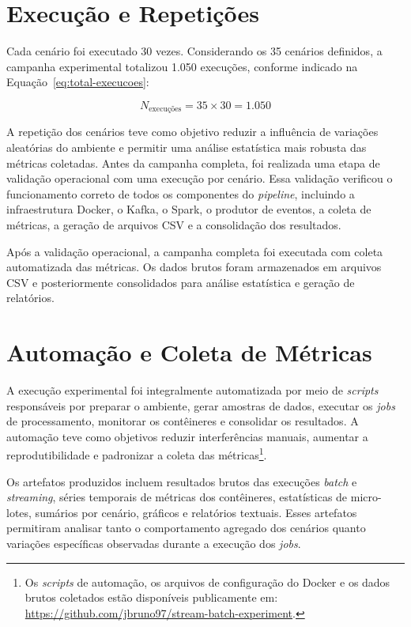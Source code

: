 \section{Execução e Repetições}
\label{sec:execucao-repeticoes}
 
Cada cenário foi executado 30 vezes. Considerando os 35 cenários definidos, a campanha experimental totalizou 1.050 execuções, conforme indicado na Equação~\ref{eq:total-execucoes}:
 
\begin{equation}
N_{\text{execuções}} = 35 \times 30 = 1.050
\label{eq:total-execucoes}
\end{equation}
 
A repetição dos cenários teve como objetivo reduzir a influência de variações aleatórias do ambiente e permitir uma análise estatística mais robusta das métricas coletadas. Antes da campanha completa, foi realizada uma etapa de validação operacional com uma execução por cenário. Essa validação verificou o funcionamento correto de todos os componentes do \textit{pipeline}, incluindo a infraestrutura Docker, o Kafka, o Spark, o produtor de eventos, a coleta de métricas, a geração de arquivos CSV e a consolidação dos resultados.
 
Após a validação operacional, a campanha completa foi executada com coleta automatizada das métricas. Os dados brutos foram armazenados em arquivos CSV e posteriormente consolidados para análise estatística e geração de relatórios.
 

\section{Automação e Coleta de Métricas}
\label{sec:automacao-coleta}
 
A execução experimental foi integralmente automatizada por meio de \textit{scripts} responsáveis por preparar o ambiente, gerar amostras de dados, executar os \textit{jobs} de processamento, monitorar os contêineres e consolidar os resultados. A automação teve como objetivos reduzir interferências manuais, aumentar a reprodutibilidade e padronizar a coleta das métricas\footnote{Os \textit{scripts} de automação, os arquivos de configuração do Docker e os dados brutos coletados estão disponíveis publicamente em: \url{https://github.com/jbruno97/stream-batch-experiment}.}.
 
Os artefatos produzidos incluem resultados brutos das execuções \textit{batch} e \textit{streaming}, séries temporais de métricas dos contêineres, estatísticas de micro-lotes, sumários por cenário, gráficos e relatórios textuais. Esses artefatos permitiram analisar tanto o comportamento agregado dos cenários quanto variações específicas observadas durante a execução dos \textit{jobs}.
 
